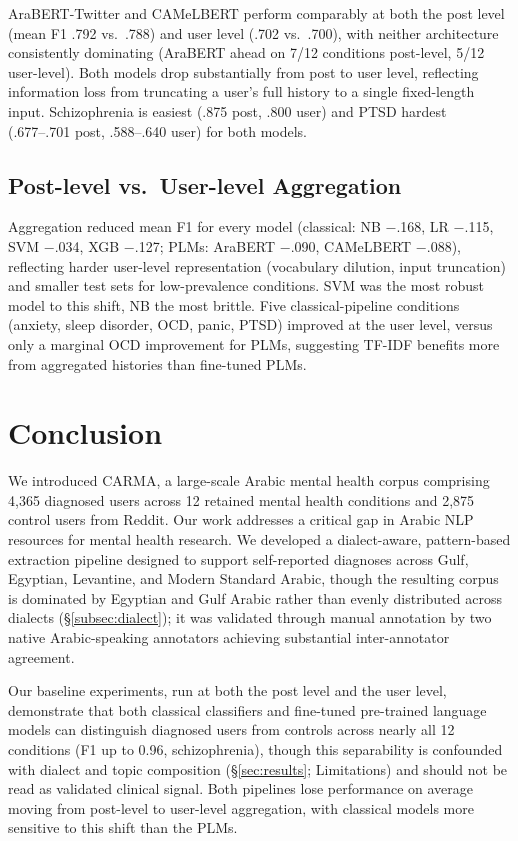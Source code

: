 \documentclass[letterpaper]{article} %
\begin{document}
AraBERT-Twitter and CAMeLBERT perform comparably at both the post level (mean F1 .792 vs.\ .788) and user level (.702 vs.\ .700), with neither architecture consistently dominating (AraBERT ahead on 7/12 conditions post-level, 5/12 user-level). Both models drop substantially from post to user level, reflecting information loss from truncating a user's full history to a single fixed-length input. Schizophrenia is easiest (.875 post, .800 user) and PTSD hardest (.677--.701 post, .588--.640 user) for both models.

\subsection{Post-level vs.\ User-level Aggregation}

Aggregation reduced mean F1 for every model (classical: NB $-$.168, LR $-$.115, SVM $-$.034, XGB $-$.127; PLMs: AraBERT $-$.090, CAMeLBERT $-$.088), reflecting harder user-level representation (vocabulary dilution, input truncation) and smaller test sets for low-prevalence conditions. SVM was the most robust model to this shift, NB the most brittle. Five classical-pipeline conditions (anxiety, sleep disorder, OCD, panic, PTSD) improved at the user level, versus only a marginal OCD improvement for PLMs, suggesting TF-IDF benefits more from aggregated histories than fine-tuned PLMs.


\section{Conclusion}
We introduced CARMA, a large-scale Arabic mental health corpus comprising 4,365 diagnosed users across 12 retained mental health conditions and 2,875 control users from Reddit. Our work addresses a critical gap in Arabic NLP resources for mental health research. We developed a dialect-aware, pattern-based extraction pipeline designed to support self-reported diagnoses across Gulf, Egyptian, Levantine, and Modern Standard Arabic, though the resulting corpus is dominated by Egyptian and Gulf Arabic rather than evenly distributed across dialects (§\ref{subsec:dialect}); it was validated through manual annotation by two native Arabic-speaking annotators achieving substantial inter-annotator agreement.

Our baseline experiments, run at both the post level and the user level, demonstrate that both classical classifiers and fine-tuned pre-trained language models can distinguish diagnosed users from controls across nearly all 12 conditions (F1 up to 0.96, schizophrenia), though this separability is confounded with dialect and topic composition (§\ref{sec:results}; Limitations) and should not be read as validated clinical signal. Both pipelines lose performance on average moving from post-level to user-level aggregation, with classical models more sensitive to this shift than the PLMs.
\end{document}
